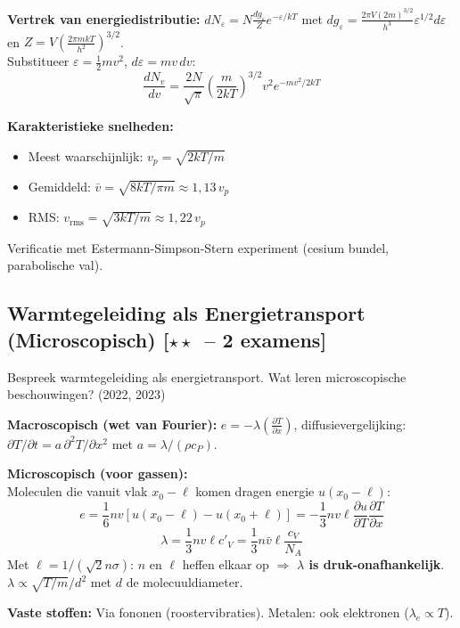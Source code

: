 \documentclass[10pt,a4paper]{article}
\newcommand{\pder}[2]{\left(\frac{\partial #1}{\partial #2}\right)}
\begin{document}
\begin{oplossing}
\textbf{Vertrek van energiedistributie:} $dN_\varepsilon = N\frac{dg_\varepsilon}{Z}e^{-\varepsilon/kT}$ met $dg_\varepsilon = \frac{2\pi V(2m)^{3/2}}{h^3}\varepsilon^{1/2}d\varepsilon$ en $Z = V\left(\frac{2\pi mkT}{h^2}\right)^{3/2}$.\\
Substitueer $\varepsilon = \frac{1}{2}mv^2$, $d\varepsilon = mv\,dv$:
$$\boxed{\frac{dN_v}{dv} = \frac{2N}{\sqrt{\pi}}\left(\frac{m}{2kT}\right)^{3/2}v^2 e^{-mv^2/2kT}}$$

\textbf{Karakteristieke snelheden:}
\begin{itemize}
  \item Meest waarschijnlijk: $v_p = \sqrt{2kT/m}$
  \item Gemiddeld: $\bar{v} = \sqrt{8kT/\pi m} \approx 1{,}13\,v_p$
  \item RMS: $v_\text{rms} = \sqrt{3kT/m} \approx 1{,}22\,v_p$
\end{itemize}
Verificatie met Estermann-Simpson-Stern experiment (cesium bundel, parabolische val).
\end{oplossing}

\subsection{Warmtegeleiding als Energietransport (Microscopisch) \textnormal{\color{warningred}[$\star\star$\ -- 2 examens]}}

\begin{theorievraag}{Bespreek warmtegeleiding als energietransport. Wat leren microscopische beschouwingen? \textnormal{(2022, 2023)}}
\end{theorievraag}

\begin{oplossing}
\textbf{Macroscopisch (wet van Fourier):} $e = -\lambda\pder{T}{x}$, diffusievergelijking: $\partial T/\partial t = a\,\partial^2T/\partial x^2$ met $a = \lambda/(\rho c_P)$.

\textbf{Microscopisch (voor gassen):}\\
Moleculen die vanuit vlak $x_0-\ell$ komen dragen energie $u(x_0-\ell)$:
$$e = \frac{1}{6}nv[u(x_0-\ell) - u(x_0+\ell)] = -\frac{1}{3}nv\ell\frac{\partial u}{\partial T}\frac{\partial T}{\partial x}$$
$$\lambda = \frac{1}{3}nv\ell c'_V = \frac{1}{3}n\bar{v}\ell\frac{c_V}{N_A}$$
Met $\ell = 1/(\sqrt{2}n\sigma)$: $n$ en $\ell$ heffen elkaar op $\Rightarrow$ \textbf{$\lambda$ is druk-onafhankelijk}.\\
$\lambda \propto \sqrt{T/m}/d^2$ met $d$ de molecuuldiameter.

\textbf{Vaste stoffen:} Via fononen (roostervibraties). Metalen: ook elektronen ($\lambda_e \propto T$).
\end{oplossing}
\end{document}
